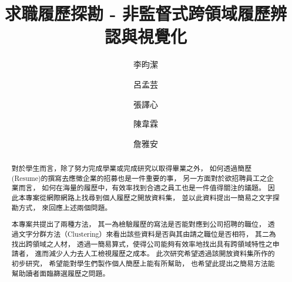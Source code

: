 \documentclass[sigconf]{acmart}
\begin{document}
\title{求職履歷探勘 - 非監督式跨領域履歷辨認與視覺化}


\author{李昀潔}
\author{呂孟芸}
\author{張譯心}
\author{陳韋霖}
\author{詹雅安}


\begin{abstract}
    對於學生而言，除了努力完成學業或完成研究以取得畢業之外，
    如何透過簡歷(Resume)的撰寫去應徵企業的招募也是一件重要的事，
    另一方面對於欲招聘員工之企業而言，
    如何在海量的履歷中，有效率找到合適之員工也是一件值得關注的議題。
    因此本專案從網際網路上找尋到個人履歷之開放資料集，
    並以此資料提出一簡易之文字探勘方式，
    來回應上述兩個問題。

    本專案共提出了兩種方法，
    其一為檢驗履歷的寫法是否能對應到公司招聘的職位，
    透過文字分群方法（Clustering）來看出該些資料是否與其由請之職位是否相符，
    其二為找出跨領域之人材，
    透過一簡易算式，使得公司能夠有效率地找出具有跨領域特性之申請者，
    進而減少人力去人工檢視履歷之成本。
    此次研究希望透過該開放資料集所作的初步研究，
    希望能對學生們製作個人簡歷上能有所幫助，
    也希望此提出之簡易方法能幫助讀者面臨篩選履歷之問題。
\end{abstract}

\end{document}
